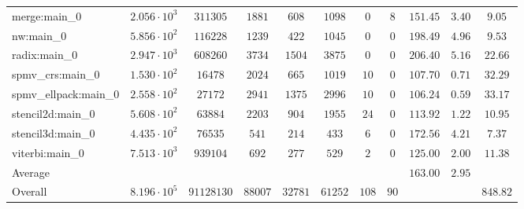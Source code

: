 \begin{tabular}{|l|c|c|c|c|c|c|c|c|c|c|}
merge:main\_0          & $ 2.056 \cdot 10^{3} $ & $ 311305   $ & $ 1881  $ & $ 608   $ & $ 1098  $ & $ 0   $ & $ 8  $ & $ 151.45      $ & $ 3.40    $ & $ 9.05    $ \\
nw:main\_0             & $ 5.856 \cdot 10^{2} $ & $ 116228   $ & $ 1239  $ & $ 422   $ & $ 1045  $ & $ 0   $ & $ 0  $ & $ 198.49      $ & $ 4.96    $ & $ 9.53    $ \\
radix:main\_0          & $ 2.947 \cdot 10^{3} $ & $ 608260   $ & $ 3734  $ & $ 1504  $ & $ 3875  $ & $ 0   $ & $ 0  $ & $ 206.40      $ & $ 5.16    $ & $ 22.66   $ \\
spmv\_crs:main\_0      & $ 1.530 \cdot 10^{2} $ & $ 16478    $ & $ 2024  $ & $ 665   $ & $ 1019  $ & $ 10  $ & $ 0  $ & $ 107.70      $ & $ 0.71    $ & $ 32.29   $ \\
spmv\_ellpack:main\_0  & $ 2.558 \cdot 10^{2} $ & $ 27172    $ & $ 2941  $ & $ 1375  $ & $ 2996  $ & $ 10  $ & $ 0  $ & $ 106.24      $ & $ 0.59    $ & $ 33.17   $ \\
stencil2d:main\_0      & $ 5.608 \cdot 10^{2} $ & $ 63884    $ & $ 2203  $ & $ 904   $ & $ 1955  $ & $ 24  $ & $ 0  $ & $ 113.92      $ & $ 1.22    $ & $ 10.95   $ \\
stencil3d:main\_0      & $ 4.435 \cdot 10^{2} $ & $ 76535    $ & $ 541   $ & $ 214   $ & $ 433   $ & $ 6   $ & $ 0  $ & $ 172.56      $ & $ 4.21    $ & $ 7.37    $ \\
viterbi:main\_0        & $ 7.513 \cdot 10^{3} $ & $ 939104   $ & $ 692   $ & $ 277   $ & $ 529   $ & $ 2   $ & $ 0  $ & $ 125.00      $ & $ 2.00    $ & $ 11.38   $ \\
\hline
Average                & $                    $ & $          $ & $       $ & $       $ & $       $ & $     $ & $    $ & $ 163.00      $ & $ 2.95    $ & $         $ \\
\hline
Overall                & $ 8.196 \cdot 10^{5} $ & $ 91128130 $ & $ 88007 $ & $ 32781 $ & $ 61252 $ & $ 108 $ & $ 90 $ & $             $ & $         $ & $ 848.82  $ \\
\hline
\end{tabular}
